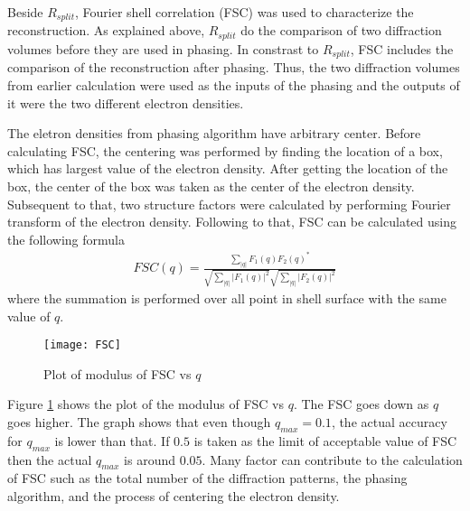 Beside $R_{split}$, Fourier shell correlation (FSC) was used to characterize the reconstruction. As explained above, $R_{split}$ do the comparison of two diffraction volumes before they are used in phasing. In constrast to $R_{split}$, FSC includes the comparison of the reconstruction after phasing. Thus, the two diffraction volumes from earlier calculation were used as the inputs of the phasing and the outputs of it were the two different electron densities. 

The eletron densities from phasing algorithm have arbitrary center. Before calculating FSC, the centering was performed by finding the location of a box, which has largest value of the electron density. After getting the location of the box, the center of the box was taken as the center of the electron density. Subsequent to that, two structure factors were calculated by performing Fourier transform of the electron density. Following to that, FSC can be calculated using the following formula
\begin{align}
FSC(q)=\frac{\sum_{|q|} F_{1}(q) F_{2}(q)^{*}}{\sqrt{\sum_{|q|}|F_{1}(q)|^2}\sqrt{\sum_{|q|}|F_{2}(q)|^2}}
\label{eq:FSC}
\end{align}
where the summation is performed over all point in shell surface with the same value of $q$. 
\begin{figure}[h!]
\centering
 \texttt{[image: FSC]}
\caption{Plot of modulus of FSC vs $q$ }
\label{fig:FSC}
\end{figure}

Figure \ref{fig:FSC} shows the plot of the modulus of FSC vs $q$. The FSC goes down as $q$ goes higher. The graph shows that even though $q_{max}=0.1$, the actual accuracy for $q_{max}$ is lower than that. If $0.5$ is taken as the limit of acceptable value of FSC then the actual $q_{max}$ is around $0.05$. Many factor can contribute to the calculation of FSC such as the total number of the diffraction patterns, the phasing algorithm, and the process of centering the electron density. 




